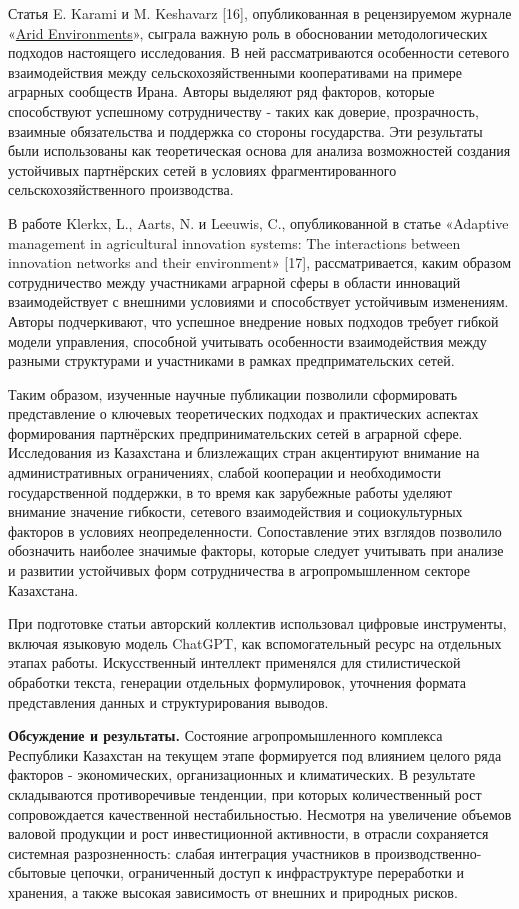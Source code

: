 Статья E. Karami и M. Keshavarz {[}16{]}, опубликованная в рецензируемом
журнале
«\href{https://www.sciencedirect.com/journal/journal-of-arid-environments}{Arid
Environments}», сыграла важную роль в обосновании методологических
подходов настоящего исследования. В ней рассматриваются особенности
сетевого взаимодействия между сельскохозяйственными кооперативами на
примере аграрных сообществ Ирана. Авторы выделяют ряд факторов, которые
способствуют успешному сотрудничеству - таких как доверие, прозрачность,
взаимные обязательства и поддержка со стороны государства. Эти
результаты были использованы как теоретическая основа для анализа
возможностей создания устойчивых партнёрских сетей в условиях
фрагментированного сельскохозяйственного производства.

В работе Klerkx, L., Aarts, N. и Leeuwis, C., опубликованной в статье
«Adaptive management in agricultural innovation systems: The
interactions between innovation networks and their environment»
{[}17{]}, рассматривается, каким образом сотрудничество между
участниками аграрной сферы в области инноваций взаимодействует с
внешними условиями и способствует устойчивым изменениям. Авторы
подчеркивают, что успешное внедрение новых подходов требует гибкой
модели управления, способной учитывать особенности взаимодействия между
разными структурами и участниками в рамках предпримательских сетей.

Таким образом, изученные научные публикации позволили сформировать
представление о ключевых теоретических подходах и практических аспектах
формирования партнёрских предпринимательских сетей в аграрной сфере.
Исследования из Казахстана и близлежащих стран акцентируют внимание на
административных ограничениях, слабой кооперации и необходимости
государственной поддержки, в то время как зарубежные работы уделяют
внимание значение гибкости, сетевого взаимодействия и социокультурных
факторов в условиях неопределенности. Сопоставление этих взглядов
позволило обозначить наиболее значимые факторы, которые следует
учитывать при анализе и развитии устойчивых форм сотрудничества в
агропромышленном секторе Казахстана.

При подготовке статьи авторский коллектив использовал цифровые
инструменты, включая языковую модель ChatGPT, как вспомогательный ресурс
на отдельных этапах работы. Искусственный интеллект применялся для
стилистической обработки текста, генерации отдельных формулировок,
уточнения формата представления данных и структурирования выводов.

{\bfseries Обсуждение и результаты.} Состояние агропромышленного комплекса
Республики Казахстан на текущем этапе формируется под влиянием целого
ряда факторов - экономических, организационных и климатических. В
результате складываются противоречивые тенденции, при которых
количественный рост сопровождается качественной нестабильностью.
Несмотря на увеличение объемов валовой продукции и рост инвестиционной
активности, в отрасли сохраняется системная разрозненность: слабая
интеграция участников в производственно-сбытовые цепочки, ограниченный
доступ к инфраструктуре переработки и хранения, а также высокая
зависимость от внешних и природных рисков.

